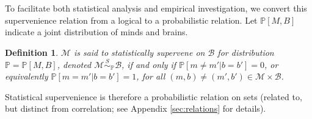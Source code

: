 \documentclass{article}
\newcommand{\mB}{\mathcal{B}}
\newcommand{\mM}{\mathcal{M}}
\newcommand{\PP}{\mathbb{P}}           %
\providecommand{\mc}[1]{\mathcal{#1}}
\newtheorem{defi}{Definition}
\begin{document}
To facilitate both statistical analysis and empirical investigation, we convert this supervenience relation from a logical to a probabilistic relation.  Let $\PP[M,B]$ indicate a joint distribution of minds and brains.
\begin{defi}
\label{def1} 
$\mM$ is said to \textit{statistically supervene} on $\mB$ for distribution $\PP=\PP[M,B]$, denoted $\mM \overset{S}{\sim}_\PP \mB$, if and only if $\PP[m \neq m' | b=b']=0$, or equivalently $\PP[m = m' | b = b']=1$, for all $(m,b) \neq (m',b') \in \mc{M} \times \mc{B}$.
\end{defi}
\noindent Statistical supervenience is therefore a probabilistic relation on sets (related to, but distinct from correlation; see Appendix \ref{sec:relations} for details).  

% 
\end{document}
